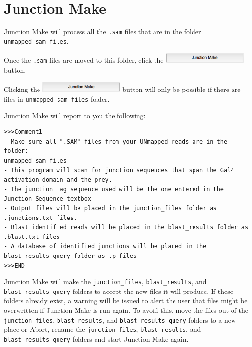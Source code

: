 \documentclass[11pt,fleqn]{book} %
\newcommand{\JunctionMake}{{\color{Blue} Junction Make }}
\begin{document}
\chapter{\JunctionMake}

\JunctionMake will process all the \texttt{.sam} files that are in the folder \texttt{unmapped\_sam\_files}.

\vspace{15pt}

Once the \texttt{.sam} files are moved to this folder, click the \includegraphics[width=120pt]{Pictures/junction_make_btn} button.

\begin{remark}
Clicking the \includegraphics[width=120pt]{Pictures/junction_make_btn} button will only be possible if there are files in \texttt{unmapped\_sam\_files} folder.
\end{remark}


\JunctionMake will report to you the following:

\begin{lstlisting}
>>>Comment1
- Make sure all ".SAM" files from your UNmapped reads are in the folder:
unmapped_sam_files
- This program will scan for junction sequences that span the Gal4 activation domain and the prey.
- The junction tag sequence used will be the one entered in the Junction Sequence textbox
- Output files will be placed in the junction_files folder as .junctions.txt files. 
- Blast identified reads will be placed in the blast_results folder as .blast.txt files
- A database of identified junctions will be placed in the blast_results_query folder as .p files
>>>END
\end{lstlisting}



\JunctionMake  will make the \texttt{junction\_files}, \texttt{blast\_results}, and \texttt{blast\_results\_query} folders to accept the new files it will produce. If these folders already exist, a warning will be issued to alert the user that files might be overwritten if \JunctionMake is run again. To avoid this, move the files out of the \texttt{junction\_files}, \texttt{blast\_results}, and \texttt{blast\_results\_query} folders to a new place or Abort, rename the \texttt{junction\_files}, \texttt{blast\_results}, and \texttt{blast\_results\_query} folders and start \JunctionMake again.
\end{document}
